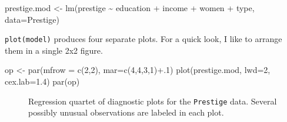 \documentclass[
  letterpaper,
  10pt,
  krantz2]{krantz}
\makeatletter
\newenvironment{Shaded}{\begin{snugshade}}{\end{snugshade}}
\newcommand{\AttributeTok}[1]{\textcolor[rgb]{0.40,0.45,0.13}{#1}}
\newcommand{\DecValTok}[1]{\textcolor[rgb]{0.68,0.00,0.00}{#1}}
\newcommand{\FloatTok}[1]{\textcolor[rgb]{0.68,0.00,0.00}{#1}}
\newcommand{\FunctionTok}[1]{\textcolor[rgb]{0.28,0.35,0.67}{#1}}
\newcommand{\NormalTok}[1]{\textcolor[rgb]{0.00,0.23,0.31}{#1}}
\newcommand{\OtherTok}[1]{\textcolor[rgb]{0.00,0.23,0.31}{#1}}
\newcommand{\SpecialCharTok}[1]{\textcolor[rgb]{0.37,0.37,0.37}{#1}}
\newenvironment{kframe}{%
  \medskip{}
  \setlength{\fboxsep}{.8em}
  \def\at@end@of@kframe{}%
  \ifinner\ifhmode%
  \def\at@end@of@kframe{\end{minipage}}%
  \begin{minipage}{\columnwidth}%
  \fi\fi%
  \def\FrameCommand##1{\hskip\@totalleftmargin \hskip-\fboxsep
  \colorbox{shadecolor}{##1}\hskip-\fboxsep
      \hskip-\linewidth \hskip-\@totalleftmargin \hskip\columnwidth}%
  \MakeFramed {\advance\hsize-\width
    \@totalleftmargin\z@ \linewidth\hsize
    \@setminipage}}%
{\par\unskip\endMakeFramed%
  \at@end@of@kframe}
\renewenvironment{Shaded}{\begin{kframe}}{\end{kframe}}
\makeatother
\begin{document}
\begin{Shaded}
\begin{Highlighting}[]
\NormalTok{prestige.mod }\OtherTok{\textless{}{-}} \FunctionTok{lm}\NormalTok{(prestige }\SpecialCharTok{\textasciitilde{}}\NormalTok{ education }\SpecialCharTok{+}\NormalTok{ income }\SpecialCharTok{+}\NormalTok{ women }\SpecialCharTok{+}\NormalTok{ type,}
                   \AttributeTok{data=}\NormalTok{Prestige)}
\end{Highlighting}
\end{Shaded}

\texttt{plot(model)} produces four separate plots. For a quick look, I
like to arrange them in a single 2x2 figure.

\begin{Shaded}
\begin{Highlighting}[]
\NormalTok{op }\OtherTok{\textless{}{-}} \FunctionTok{par}\NormalTok{(}\AttributeTok{mfrow =} \FunctionTok{c}\NormalTok{(}\DecValTok{2}\NormalTok{,}\DecValTok{2}\NormalTok{), }
          \AttributeTok{mar=}\FunctionTok{c}\NormalTok{(}\DecValTok{4}\NormalTok{,}\DecValTok{4}\NormalTok{,}\DecValTok{3}\NormalTok{,}\DecValTok{1}\NormalTok{)}\SpecialCharTok{+}\NormalTok{.}\DecValTok{1}\NormalTok{)}
\FunctionTok{plot}\NormalTok{(prestige.mod, }\AttributeTok{lwd=}\DecValTok{2}\NormalTok{, }\AttributeTok{cex.lab=}\FloatTok{1.4}\NormalTok{)}
\FunctionTok{par}\NormalTok{(op)}
\end{Highlighting}
\end{Shaded}

\begin{figure}[H]


\caption{\label{fig-plot-prestige-mod}Regression quartet of diagnostic
plots for the \texttt{Prestige} data. Several possibly unusual
observations are labeled in each plot.}

\end{figure}%
\end{document}
